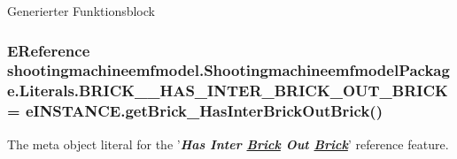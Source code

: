 Generierter Funktionsblock \hypertarget{interfaceshootingmachineemfmodel_1_1_shootingmachineemfmodel_package_1_1_literals_adbf3f5f867f77e8462a1f525df767381}{
\subsubsection[{B\-R\-I\-C\-K\-\_\-\-\_\-\-H\-A\-S\-\_\-\-I\-N\-T\-E\-R\-\_\-\-B\-R\-I\-C\-K\-\_\-\-O\-U\-T\-\_\-\-B\-R\-I\-C\-K}]{\setlength{\rightskip}{0pt plus 5cm}E\-Reference shootingmachineemfmodel.\-Shootingmachineemfmodel\-Package.\-Literals.\-B\-R\-I\-C\-K\-\_\-\-\_\-\-H\-A\-S\-\_\-\-I\-N\-T\-E\-R\-\_\-\-B\-R\-I\-C\-K\-\_\-\-O\-U\-T\-\_\-\-B\-R\-I\-C\-K = e\-I\-N\-S\-T\-A\-N\-C\-E.\-get\-Brick\-\_\-\-Has\-Inter\-Brick\-Out\-Brick()}}\label{interfaceshootingmachineemfmodel_1_1_shootingmachineemfmodel_package_1_1_literals_adbf3f5f867f77e8462a1f525df767381}
The meta object literal for the '{\itshape {\bfseries Has Inter \hyperlink{interfaceshootingmachineemfmodel_1_1_brick}{Brick} Out \hyperlink{interfaceshootingmachineemfmodel_1_1_brick}{Brick}}}' reference feature.

